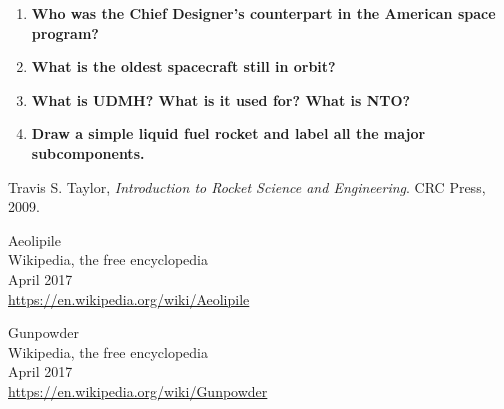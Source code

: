 \documentclass{article}
\begin{document}
\begin{enumerate}
	\item {\bf Who was the Chief Designer’s counterpart in the American space program?}\\
	
	\item {\bf What is the oldest spacecraft still in orbit?}\\
	
	\item {\bf What is UDMH? What is it used for? What is NTO?}\\
	
	\item {\bf Draw a simple liquid fuel rocket and label all the major subcomponents.}\\
	
\end{enumerate}


\cleardoublepage

\begin{thebibliography}{99}

	Travis S. Taylor,
	\emph{Introduction to Rocket Science and Engineering}.
	CRC Press,
	2009.
	
	Aeolipile\\
	Wikipedia, the free encyclopedia\\
	April 2017\\
	\url{https://en.wikipedia.org/wiki/Aeolipile}

	Gunpowder\\
	Wikipedia, the free encyclopedia\\
	April 2017\\
	\url{https://en.wikipedia.org/wiki/Gunpowder}

\end{thebibliography}
\end{document}
